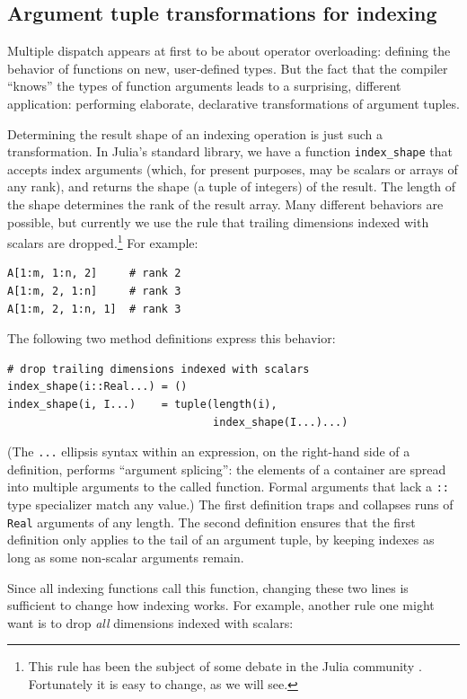 \documentclass{sigplanconf}
\newcommand{\code}[1]{\texttt{#1}}
\begin{document}
\subsection{Argument tuple transformations for indexing}

Multiple dispatch appears at first to be about operator overloading:
defining the behavior of functions on new, user-defined types.
But the fact that the compiler ``knows'' the types of function arguments leads
to a surprising, different application: performing elaborate, declarative
transformations of argument tuples.

Determining the result shape of an indexing operation is just such a
transformation. In Julia's standard library, we have a function
\code{index\_shape} that accepts index arguments (which, for present
purposes, may be scalars or arrays of any rank), and returns the
shape (a tuple of integers) of the result. The length of the shape
determines the rank of the result array. Many different behaviors
are possible, but currently we use the rule that trailing dimensions
indexed with scalars are dropped.\footnote{This rule has been the subject of
some debate in the Julia community \cite{issue5949}. Fortunately it is easy to change,
as we will see.}
For example:

\begin{verbatim}
A[1:m, 1:n, 2]     # rank 2
A[1:m, 2, 1:n]     # rank 3
A[1:m, 2, 1:n, 1]  # rank 3
\end{verbatim}

The following two method definitions express this behavior:

{\small
\begin{verbatim}
# drop trailing dimensions indexed with scalars
index_shape(i::Real...) = ()
index_shape(i, I...)    = tuple(length(i),
                                index_shape(I...)...)
\end{verbatim}
}
(The \code{...} ellipsis syntax within an expression, on the right-hand side of
a definition, performs ``argument splicing'': the elements of a container
are spread into multiple arguments to the called function. Formal
arguments that lack a \code{::} type specializer match any value.)
The first definition traps and collapses runs of \code{Real} arguments of
any length. The second definition ensures that the first definition only
applies to the tail of an argument tuple, by keeping indexes as long as
some non-scalar arguments remain.

Since all indexing functions call this function, changing these two lines is
sufficient to change how indexing works. For example, another rule one might
want is to drop \emph{all} dimensions indexed with scalars:
\end{document}

